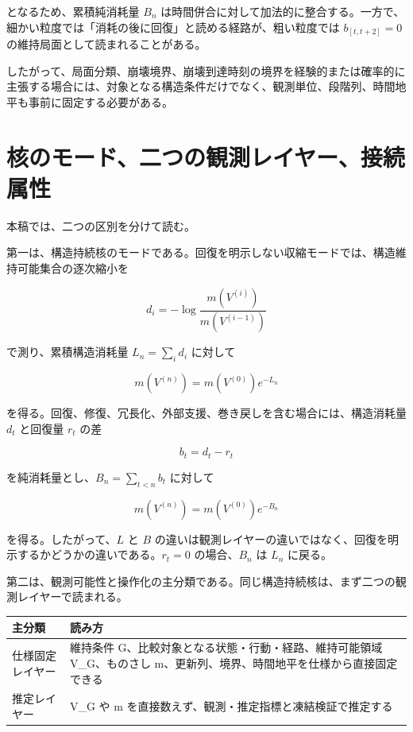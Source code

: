 \documentclass[12pt,a4paper]{article}
\begin{document}
となるため、累積純消耗量 \(B_{n}\) は時間併合に対して加法的に整合する。一方で、細かい粒度では「消耗の後に回復」と読める経路が、粗い粒度では \(b_{[t,t+2]}=0\) の維持局面として読まれることがある。

したがって、局面分類、崩壊境界、崩壊到達時刻の境界を経験的または確率的に主張する場合には、対象となる構造条件だけでなく、観測単位、段階列、時間地平も事前に固定する必要がある。

\section{核のモード、二つの観測レイヤー、接続属性}\label{ux6838ux306eux30e2ux30fcux30c9ux4e8cux3064ux306eux89b3ux6e2cux30ecux30a4ux30e4ux30fcux63a5ux7d9aux5c5eux6027}

本稿では、二つの区別を分けて読む。

第一は、構造持続核のモードである。回復を明示しない収縮モードでは、構造維持可能集合の逐次縮小を

\[
d_{i}=-\log\frac{m(V^{(i)})}{m(V^{(i-1)})}
\]

で測り、累積構造消耗量 \(L_{n}=\sum_{i} d_{i}\) に対して

\[
m(V^{(n)})=m(V^{(0)})e^{-L_{n}}
\]

を得る。回復、修復、冗長化、外部支援、巻き戻しを含む場合には、構造消耗量 \(d_{t}\) と回復量 \(r_{t}\) の差

\[
b_{t}=d_{t}-r_{t}
\]

を純消耗量とし、\(B_{n}=\sum_{t<n}b_{t}\) に対して

\[
m(V^{(n)})=m(V^{(0)})e^{-B_{n}}
\]

を得る。したがって、\(L\) と \(B\) の違いは観測レイヤーの違いではなく、回復を明示するかどうかの違いである。\(r_{t}=0\) の場合、\(B_{n}\) は \(L_{n}\) に戻る。

第二は、観測可能性と操作化の主分類である。同じ構造持続核は、まず二つの観測レイヤーで読まれる。

{\def\LTcaptype{table} %
\begin{longtable}[]{@{}
  >{\raggedright\arraybackslash}p{}
  >{\raggedright\arraybackslash}p{}@{}}
\toprule\noalign{}
\begin{minipage}[b]{\linewidth}\raggedright
主分類
\end{minipage} & \begin{minipage}[b]{\linewidth}\raggedright
読み方
\end{minipage} \\
\midrule\noalign{}
\endhead
\bottomrule\noalign{}
\endlastfoot
仕様固定レイヤー & 維持条件 G、比較対象となる状態・行動・経路、維持可能領域 V\_G、ものさし m、更新列、境界、時間地平を仕様から直接固定できる \\
推定レイヤー & V\_G や m を直接数えず、観測・推定指標と凍結検証で推定する \\
\end{longtable}
}
\end{document}
